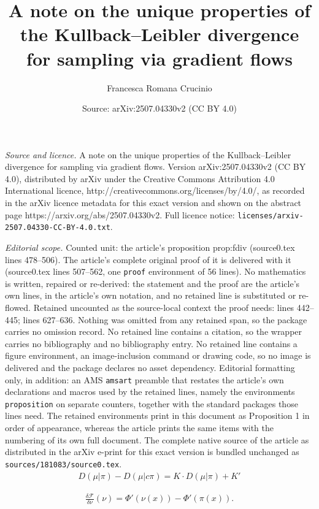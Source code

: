 \documentclass[10pt,a4paper]{amsart}
\title{A note on the unique properties of the Kullback--Leibler divergence for sampling via gradient flows}
\author{Francesca Romana Crucinio}
\date{Source: arXiv:2507.04330v2 (CC BY 4.0)}
\newcommand{\cF}{\mathcal F}
\begin{document}
\maketitle

\noindent\emph{Source and licence.} A note on the unique properties of the Kullback--Leibler divergence for sampling via gradient flows. Version arXiv:2507.04330v2 (CC BY 4.0), distributed by arXiv under the Creative Commons Attribution 4.0 International licence, http://creativecommons.org/licenses/by/4.0/, as recorded in the arXiv licence metadata for this exact version and shown on the abstract page https://arxiv.org/abs/2507.04330v2. Full licence notice: \texttt{licenses/arxiv-2507.04330-CC-BY-4.0.txt}.\par\smallskip

\noindent\textit{Editorial scope.} Counted unit: the article's proposition prop:fdiv (source0.tex lines 478--506). The article's complete original proof of it is delivered with it (source0.tex lines 507--562, one \texttt{proof} environment of 56 lines). No mathematics is written, repaired or re-derived: the statement and the proof are the article's own lines, in the article's own notation, and no retained line is substituted or re-flowed.  Retained uncounted as the source-local context the proof needs: lines 442--445; lines 627--636.  Nothing was omitted from any retained span, so the package carries no omission record.  No retained line contains a citation, so the wrapper carries no bibliography and no bibliography entry.  No retained line contains a figure environment, an image-inclusion command or drawing code, so no image is delivered and the package declares no asset dependency.  Editorial formatting only, in addition: an AMS \texttt{amsart} preamble that restates the article's own declarations and macros used by the retained lines, namely the environments \texttt{proposition} on separate counters, together with the standard packages those lines need.  The retained environments print in this document as Proposition 1 in order of appearance, whereas the article prints the same items with the numbering of its own full document.  The complete native source of the article as distributed in the arXiv e-print for this exact version is bundled unchanged as \texttt{sources/181083/source0.tex}.
\begin{align}
\label{eq:relaxed}
    D(\mu|\pi)-D(\mu|c\pi) = K\cdot D(\mu|\pi)+K'
\end{align}

\begin{align*}
    \frac{\delta \cF}{\delta \nu}(\nu)= \Phi'(\nu(x)) - \Phi'(\pi(x)).
\end{align*}
\end{document}
